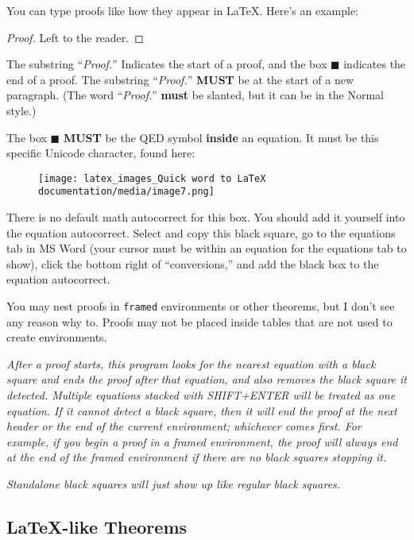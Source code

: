 \documentclass[
]{article}
\theoremstyle{plain}
\theoremstyle{remark}
\theoremstyle{definition}
\begin{document}
You can type proofs like how they appear in LaTeX. Here's an example:

\begin{proof} Left to the reader. 
\end{proof}

The substring ``\emph{Proof.}'' Indicates the start of a proof, and the
box \(\blacksquare\) indicates the end of a proof. The substring
``\emph{Proof.}'' \textbf{MUST} be at the start of a new paragraph. (The
word ``\emph{Proof.}'' \textbf{must} be slanted, but it can be in the
Normal style.)

The box \(\blacksquare\) \textbf{MUST} be the QED symbol \textbf{inside}
an equation. It must be this specific Unicode character, found here:


\begin{figure}[H]
\centering
\texttt{[image: latex\_images\_Quick word to LaTeX documentation/media/image7.png]}
\end{figure}

There is no default math autocorrect for this box. You should add it
yourself into the equation autocorrect. Select and copy this black
square, go to the equations tab in MS Word (your cursor must be within
an equation for the equations tab to show), click the bottom right of
``conversions,'' and add the black box to the equation autocorrect.

You may nest proofs in \texttt{framed} environments or other theorems,
but I don't see any reason why to. Proofs may not be placed inside
tables that are not used to create environments.

\emph{After a proof starts, this program looks for the nearest equation
with a black square and ends the proof after that equation, and also
removes the black square it detected. Multiple equations stacked with
SHIFT+ENTER will be treated as one equation. If it cannot detect a black
square, then it will end the proof at the next header or the end of the
current environment; whichever comes first. For example, if you begin a
proof in a framed environment, the proof will always end at the end of
the framed environment if there are no black squares stopping it.}

\emph{Standalone black squares will just show up like regular black
squares.}


\subsection{LaTeX-like Theorems}
\end{document}
